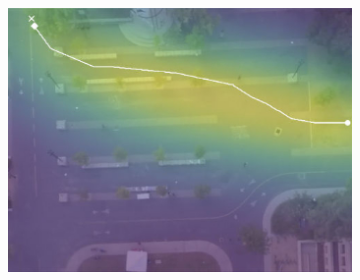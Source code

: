 \documentclass[letterpaper,10pt,conference]{ieeeconf}
\begin{document}
\begin{figure}[t!]
\begin{subfigure}[t]{0.48\textwidth}
	\begin{minipage}[c]{0.3\linewidth}
		\includegraphics[width=\linewidth]{./figures/bookstore/ours_1_2_t=370.jpg}
	\end{minipage}
	

\end{subfigure}
\end{figure}
\end{document}
